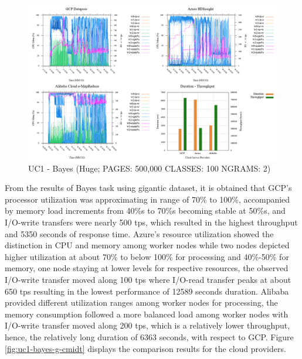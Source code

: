 \documentclass[review]{elsarticle}
\begin{document}
\begin{figure}[p]
	\caption{UC1 - Bayes (Huge; PAGES: 500,000 CLASSES: 100 NGRAMS: 2)}
	\label{fig:uc1-bayes-h-cmidt}
	\includegraphics[width=\textwidth]{uc1-bayes-h-cmidt}
	\centering
\end{figure}

From the results of Bayes task using gigantic dataset, it is obtained that GCP's processor utilization was approximating in range of 70\% to 100\%, accompanied by memory load increments from 40\%s to 70\%s becoming stable at 50\%s, and I/O-write transfers were nearly 500 tps, which resulted in the highest throughput and 5350 seconds of response time. Azure's resource utilization showed the distinction in CPU and memory among worker nodes while two nodes depicted higher utilization at about 70\% to below 100\% for processing and 40\%-50\% for memory, one node staying at lower levels for respective resources, the observed I/O-write transfer moved along 100 tps where I/O-read transfer peaks at about 650 tps resulting in the lowest performance of 12589 seconds duration. Alibaba provided different utilization ranges among worker nodes for processing, the memory consumption followed a more balanced load among worker nodes with I/O-write transfer moved along 200 tps, which is a relatively lower throughput, hence, the relatively long duration of 6363 seconds, with respect to GCP. Figure \ref{fig:uc1-bayes-g-cmidt} displays the comparison results for the cloud providers.
\end{document}
